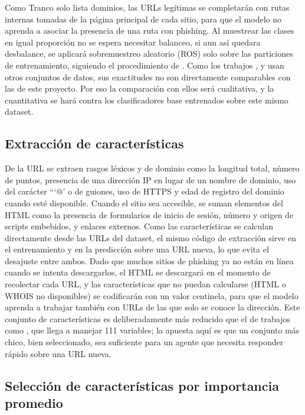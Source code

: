 Como Tranco solo lista dominios, las URLs legítimas se completarán con rutas internas tomadas de la página principal de cada sitio, para que el modelo no aprenda a asociar la presencia de una ruta con phishing. Al muestrear las clases en igual proporción no se espera necesitar balanceo, si aun así quedara desbalance, se aplicará sobremuestreo aleatorio (ROS) solo sobre las particiones de entrenamiento, siguiendo el procedimiento de \cite{kalabarige2022multilayer}. Como los trabajos \cite{kalabarige2022multilayer}, \cite{kalabarige2023boosting} y \cite{alsariera2020ai} usan otros conjuntos de datos, sus exactitudes no son directamente comparables con las de este proyecto. Por eso la comparación con ellos será cualitativa, y la cuantitativa se hará contra los clasificadores base entrenados sobre este mismo dataset.

\subsection{Extracción de características}

De la URL se extraen rasgos léxicos y de dominio como la longitud total, número de puntos, presencia de una dirección IP en lugar de un nombre de dominio, uso del carácter ```@' o de guiones, uso de HTTPS y edad de registro del dominio cuando esté disponible. Cuando el sitio sea accesible, se suman elementos del HTML como la presencia de formularios de inicio de sesión, número y origen de scripts embebidos, y enlaces externos. Como las características se calculan directamente desde las URLs del dataset, el mismo código de extracción sirve en el entrenamiento y en la predicción sobre una URL nueva, lo que evita el desajuste entre ambos. Dado que muchos sitios de phishing ya no están en línea cuando se intenta descargarlos, el HTML se descargará en el momento de recolectar cada URL, y las características que no puedan calcularse (HTML o WHOIS no disponibles) se codificarán con un valor centinela, para que el modelo aprenda a trabajar también con URLs de las que solo se conoce la dirección. Este conjunto de características es deliberadamente más reducido que el de trabajos como \cite{kalabarige2023boosting}, que llega a manejar 111 variables; la apuesta aquí es que un conjunto más chico, bien seleccionado, sea suficiente para un agente que necesita responder rápido sobre una URL nueva.

\subsection{Selección de características por importancia promedio}

